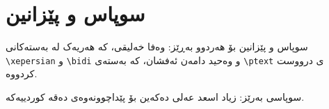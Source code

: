\documentclass[a4paper,12pt]{article}
\begin{document}
\section{سوپاس و پێزانین‌}

سوپاس و پێزانین بۆ هەردوو بەڕێز: وەفا خەلیقی، کە هەریەک لە بەستەکانی 
\verb!\xepersian!
 و
\verb!\bidi!
   و وەحید دامەن ئەفشان، کە بەستەی
\verb!\ptext!
 ی درووست کردووە.
 
 سوپاسی به‌رێز: زیاد اسعد عەلی ده‌كه‌ین بۆ پێداچوونه‌وه‌ی ده‌قه‌ كوردییه‌كه‌.
\end{document}
